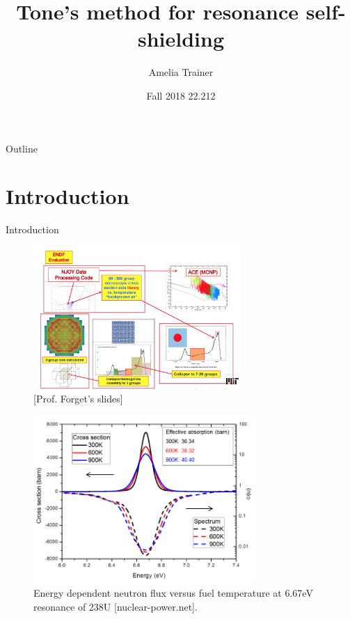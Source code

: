 \documentclass{beamer}
\title[Tone’s method]{Tone’s method for resonance self-shielding}
\author{Amelia Trainer}
\date{Fall 2018 22.212}
\begin{document}
\begin{frame}
  \titlepage
\end{frame}

\begin{frame}{Outline}
  \tableofcontents
\end{frame}

\section{Introduction}

\begin{frame}{Introduction}
\begin{figure}
\includegraphics[width=0.7\textwidth]{f1}
  \caption{[Prof. Forget's slides]}
\end{figure}
\end{frame}




\begin{frame}
\begin{figure}
\includegraphics[width=0.75\textwidth]{self-shielding}
  \caption{Energy dependent neutron flux versus fuel temperature at 6.67eV resonance of 238U [nuclear-power.net].}
\end{figure}
\end{frame}
\end{document}
